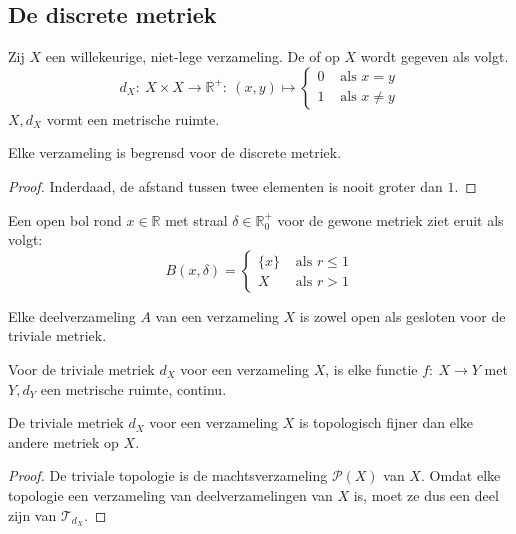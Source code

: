 \documentclass[main.tex]{subfiles}
\begin{document}
\subsection{De discrete metriek}
\label{sec:de-discrete-metriek}

\begin{vb}
  Zij $X$ een willekeurige, niet-lege verzameling.
  De  of  op $X$ wordt gegeven als volgt.
  \[
  d_{X}:\ X \times X \rightarrow \mathbb{R}^{+}:\ (x,y) \mapsto
  \begin{cases}
    0 &\text{ als } x = y\\
    1 &\text{ als } x \neq y
  \end{cases}
  \]
  $X,d_{X}$ vormt een metrische ruimte.
\end{vb}

\begin{st}
  Elke verzameling is begrensd voor de discrete metriek.

  \begin{proof}
    Inderdaad, de afstand tussen twee elementen is nooit groter dan $1$.
  \end{proof}
\end{st}

\begin{vb}
  Een open bol rond $x\in \mathbb{R}$ met straal $\delta\in \mathbb{R}_{0}^{+}$ voor de gewone metriek ziet eruit als volgt:
  \[ B(x,\delta) = 
  \begin{cases}
    \{x\} &\text{ als } r\le 1\\
    X &\text{ als } r > 1
  \end{cases}
  \]
\end{vb}

\begin{st}
  Elke deelverzameling $A$ van een verzameling $X$ is zowel open als gesloten voor de triviale metriek.
\end{st}


\begin{vb}
  Voor de triviale metriek $d_{X}$ voor een verzameling $X$, is elke functie $f:\ X \rightarrow Y$ met $Y,d_{Y}$ een metrische ruimte, continu.
\end{vb}

\begin{st}
  De triviale metriek $d_{X}$ voor een verzameling $X$ is topologisch fijner dan elke andere metriek op $X$.

  \begin{proof}
    De triviale topologie is de machtsverzameling $\mathcal{P}(X)$ van $X$.
    Omdat elke topologie een verzameling van deelverzamelingen van $X$ is, moet ze dus een deel zijn van $\mathcal{T}_{d_{X}}$.
  \end{proof}
\end{st}
\end{document}
